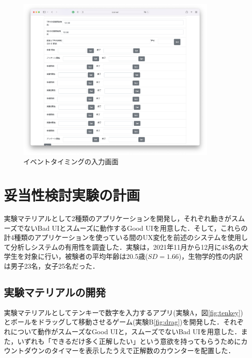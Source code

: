 \begin{figure}[htbp]
  \begin{minipage}{\hsize}
    \begin{center}
       \includegraphics[width=100mm]{img/analyzer2}
    \end{center}
    \caption{イベントタイミングの入力画面}
    \label{fig:eventmap2}
  \end{minipage}
\end{figure}

\section{妥当性検討実験の計画}


実験マテリアルとして2種類のアプリケーションを開発し，それぞれ動きがスムーズでないBad UIとスムーズに動作するGood UIを用意した．そして，これらの計4種類のアプリケーションを使っている間のUX変化を前述のシステムを使用して分析しシステムの有用性を調査した．実験は，2021年11月から12月に48名の大学生を対象に行い，被験者の平均年齢は20.5歳($SD=1.66$)，生物学的性の内訳は男子23名，女子25名だった．

\subsection{実験マテリアルの開発}

実験マテリアルとしてテンキーで数字を入力するアプリ(実験A，図\ref{fig:tenkey})とボールをドラッグして移動させるゲーム(実験B\ref{fig:drag})を開発した．それぞれについて動作がスムーズなGood UIと，スムーズでないBad UIを用意した．また，いずれも「できるだけ多く正解したい」という意欲を持ってもらうためにカウントダウンのタイマーを表示したうえで正解数のカウンターを配置した．

